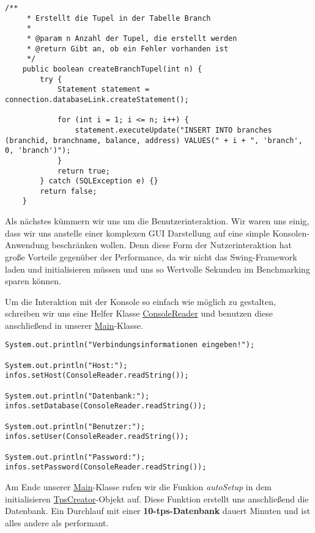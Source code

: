 \begin{lstlisting}[caption={Eine der drei Tupel Funktionen}]
	/**
	 * Erstellt die Tupel in der Tabelle Branch
	 * 
	 * @param n Anzahl der Tupel, die erstellt werden
	 * @return Gibt an, ob ein Fehler vorhanden ist
	 */
	public boolean createBranchTupel(int n) {
		try {
			Statement statement = connection.databaseLink.createStatement();

			for (int i = 1; i <= n; i++) {
				statement.executeUpdate("INSERT INTO branches (branchid, branchname, balance, address) VALUES(" + i + ", 'branch', 0, 'branch')");
			}
			return true;
		} catch (SQLException e) {}		
		return false;
	}
\end{lstlisting}

Als nächstes kümmern wir uns um die Benutzerinteraktion. Wir waren uns
einig, dass wir uns anstelle einer komplexen GUI Darstellung auf eine simple
Konsolen-Anwendung beschränken wollen. Denn diese Form der
Nutzerinteraktion hat große Vorteile gegenüber der Performance, da wir nicht
das Swing-Framework laden und initialisieren müssen und uns so Wertvolle
Sekunden im Benchmarking sparen können.

Um die Interaktion mit der Konsole so einfach wie möglich zu gestalten,
schreiben wir uns eine Helfer Klasse \hyperref[lst:crv2]{ConsoleReader} und
benutzen diese anschließend in unserer \hyperref[lst:mainv2]{Main}-Klasse.

\begin{lstlisting}[caption={Verbindungsinformationen per Konsole}]
System.out.println("Verbindungsinformationen eingeben!");
			
System.out.println("Host:");
infos.setHost(ConsoleReader.readString());

System.out.println("Datenbank:");
infos.setDatabase(ConsoleReader.readString());

System.out.println("Benutzer:");
infos.setUser(ConsoleReader.readString());

System.out.println("Password:");
infos.setPassword(ConsoleReader.readString());
\end{lstlisting}

Am Ende unserer \hyperref[lst:mainv2]{Main}-Klasse rufen wir die Funkion
\textit{autoSetup} in dem initialisieren \hyperref[lst:tpsv2]{TpsCreator}-Objekt
auf. Diese Funktion erstellt uns anschließend die Datenbank. Ein Durchlauf mit
einer \textbf{10-tps-Datenbank} dauert  Minuten und ist alles andere als performant.
\clearpage
